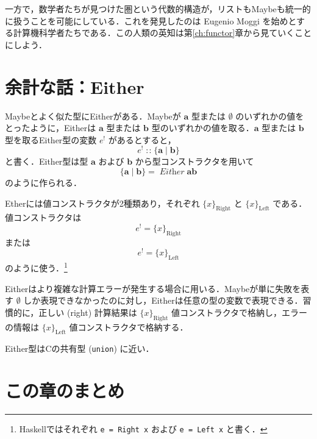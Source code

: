 \documentclass[a4paper,twocolumn]{jsbook}
\newcommand{\programminglanguage}[1]{\textsf{#1}}
\newcommand{\clang}{\programminglanguage{C}}
\newcommand{\haskell}{\programminglanguage{Haskell}}
\newcommand{\code}[1]{\texttt{#1}}
\newcommand{\mNothing}{\emptyset}
\DeclareMathOperator{\mIn}{{:\!:}}
\newcommand{\mSpecialSub}[1]{\text{#1}}
\newcommand{\mLeft}{\mSpecialSub{Left}}
\newcommand{\mRight}{\mSpecialSub{Right}}
\newcommand{\mType}[1]{\mathbf{#1}}
\newcommand{\mEitherLeftWith}[1]{\{#1\}_\mLeft}
\newcommand{\mEitherRightWith}[1]{\{#1\}_\mRight}
\newcommand{\mEitherType}[2]{\{\mType{#1}\mid\mType{#2}\}}
\newcommand{\mTypeConstructor}[1]{\mathit{#1}} %
\DeclareMathOperator{\mEitherTypeConstructor}{\mTypeConstructor{Either}}
\newcommand{\mEither}[1]{{#1}^\text{!}}
\begin{document}

一方で，数学者たちが見つけた圏という代数的構造が，リストもMaybeも統一的に扱うことを可能にしている．これを発見したのは Eugenio Moggi を始めとする計算機科学者たちである．この人類の英知は第\ref{ch:functor}章から見ていくことにしよう．


\section{余計な話：Either}

Maybeとよく似た型にEitherがある．Maybeが $\mType{a}$ 型または $\mNothing$ のいずれかの値をとったように，Eitherは $\mType{a}$ 型または $\mType{b}$ 型のいずれかの値を取る．$\mType{a}$ 型または $\mType{b}$ 型を取るEither型の変数 $\mEither{e}$ があるとすると，
\begin{equation}
\mEither{e}\mIn{}\mEitherType{a}{b}
\end{equation}
と書く．Either型は型 $\mType{a}$ および $\mType{b}$ から型コンストラクタを用いて
\begin{equation}
\mEitherType{a}{b}=\mEitherTypeConstructor\mType{a}\mType{b}
\end{equation}
のように作られる．

Etherには値コンストラクタが2種類あり，それぞれ $\mEitherRightWith{x}$ と $\mEitherLeftWith{x}$ である．値コンストラクタは
\begin{equation}
\mEither{e}=\mEitherRightWith{x}
\end{equation}
または
\begin{equation}
\mEither{e}=\mEitherLeftWith{x}
\end{equation}
のように使う．\footnote{\haskell ではそれぞれ \code{e = Right x} および \code{e = Left x} と書く．}

Eitherはより複雑な計算エラーが発生する場合に用いる．Maybeが単に失敗を表す $\mNothing$ しか表現できなかったのに対し，Eitherは任意の型の変数で表現できる．習慣的に，正しい (right) 計算結果は $\mEitherRightWith{x}$ 値コンストラクタで格納し，エラーの情報は $\mEitherLeftWith{x}$ 値コンストラクタで格納する．

Either型は\clang の共有型 (\code{union}) に近い．

\section{この章のまとめ}
\end{document}
